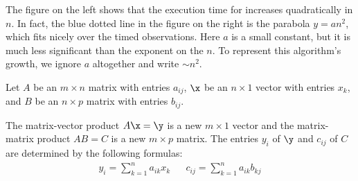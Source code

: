 The figure on the left shows that the execution time for  increases quadratically in $n$.
In fact, the blue dotted line in the figure on the right is the parabola $y = an^2$, which fits nicely over the timed observations. Here $a$ is a small constant, but it is much less significant than the exponent on the $n$.
To represent this algorithm's growth, we ignore $a$ altogether and write  $\sim n^2$.

\begin{problem} %
Let $A$ be an $m \times n$ matrix with entries $a_{ij}$, $\x$ be an $n \times 1$ vector with entries $x_k$, and $B$ be an $n \times p$ matrix with entries $b_{ij}$.
%

The matrix-vector product $A\x = \y$ is a new $m \times 1$ vector and the matrix-matrix product $AB = C$ is a new $m \times p$ matrix.
The entries $y_i$ of $\y$ and $c_{ij}$ of $C$ are determined by the following formulas:
%
\begin{align*}
y_i = \sum_{k=1}^n a_{ik}x_k%
&&
c_{ij} = \sum_{k=1}^n a_{ik}b_{kj}%
\end{align*}


\end{problem}

